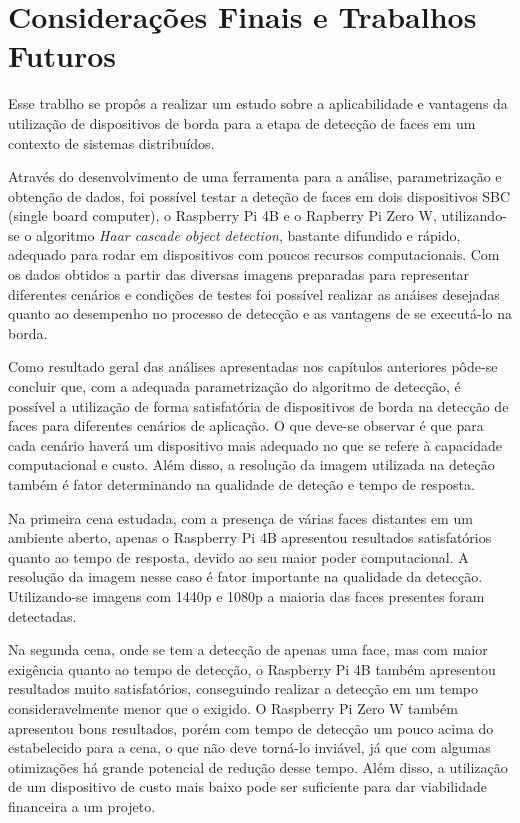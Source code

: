 \chapter{Considerações Finais e Trabalhos \mbox{Futuros}}\label{cap:conclusao}
\thispagestyle{plain}

Esse trablho se propôs a realizar um estudo sobre a aplicabilidade e vantagens da utilização de dispositivos de borda para a etapa de detecção de faces em um contexto de sistemas distribuídos.

Através do desenvolvimento de uma ferramenta para a análise, parametrização e obtenção de dados, foi possível testar a deteção de faces em dois dispositivos SBC (single board computer), o Raspberry Pi 4B e o Rapberry Pi Zero W, utilizando-se o algoritmo \textit{Haar cascade object detection}, bastante difundido e rápido, adequado para rodar em dispositivos com poucos recursos computacionais. Com os dados obtidos a partir das diversas imagens preparadas para representar diferentes cenários e condições de testes foi possível realizar as anáises desejadas quanto ao desempenho no processo de detecção e as vantagens de se executá-lo na borda.

Como resultado geral das análises apresentadas nos capítulos anteriores pôde-se concluir que, com a adequada parametrização do algoritmo de detecção, é possível a utilização de forma satisfatória de dispositivos de borda na detecção de faces para diferentes cenários de aplicação. O que deve-se observar é que para cada cenário haverá um dispositivo mais adequado no que se refere à capacidade computacional e custo. Além disso, a resolução da imagem utilizada na deteção também é fator determinando na qualidade de deteção e tempo de resposta.

Na primeira cena estudada, com a presença de várias faces distantes em um ambiente aberto, apenas o Raspberry Pi 4B apresentou resultados satisfatórios quanto ao tempo de resposta, devido ao seu maior poder computacional. A resolução da imagem nesse caso é fator importante na qualidade da detecção. Utilizando-se imagens com 1440p e 1080p a maioria das faces presentes foram detectadas.

Na segunda cena, onde se tem a detecção de apenas uma face, mas com maior exigência quanto ao tempo de detecção, o Raspberry Pi 4B também apresentou resultados muito satisfatórios, conseguindo realizar a detecção em um tempo consideravelmente menor que o exigido. O Raspberry Pi Zero W também apresentou bons resultados, porém com tempo de detecção um pouco acima do estabelecido para a cena, o que não deve torná-lo inviável, já que com algumas otimizações há grande potencial de redução desse tempo. Além disso, a utilização de um dispositivo de custo mais baixo pode ser suficiente para dar viabilidade financeira a um projeto.

